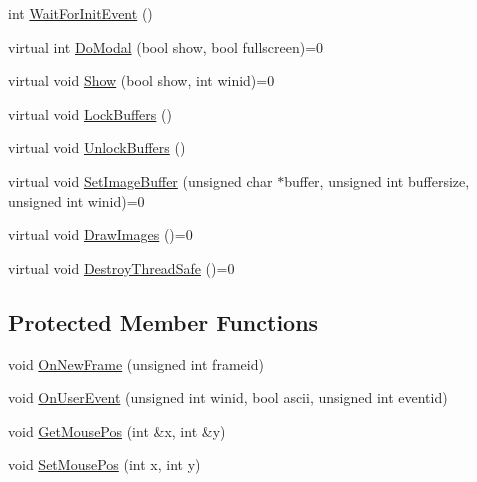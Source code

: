 \begin{DoxyCompactItemize}
int \hyperlink{classsvl_window_manager_base_a2e6ea04ac4c4403c6f442ed80b308267}{Wait\+For\+Init\+Event} ()
\item 
virtual int \hyperlink{classsvl_window_manager_base_a74b90c01c71feb43abc912d0f85b24f3}{Do\+Modal} (bool show, bool fullscreen)=0
\item 
virtual void \hyperlink{classsvl_window_manager_base_adb4ef704308882625b8a9bd5b978f408}{Show} (bool show, int winid)=0
\item 
virtual void \hyperlink{classsvl_window_manager_base_afcb9c9ab6b483e25e6e4a6be44cee53a}{Lock\+Buffers} ()
\item 
virtual void \hyperlink{classsvl_window_manager_base_a3de36fded4442ddf69cf2c9e8b2a5cfe}{Unlock\+Buffers} ()
\item 
virtual void \hyperlink{classsvl_window_manager_base_a7c9f61a0101acb234df5f8f192bd62af}{Set\+Image\+Buffer} (unsigned char $\ast$buffer, unsigned int buffersize, unsigned int winid)=0
\item 
virtual void \hyperlink{classsvl_window_manager_base_a5c285307a85fe67e084487041c82182b}{Draw\+Images} ()=0
\item 
virtual void \hyperlink{classsvl_window_manager_base_ae21e9e1b5af8e735e711422f478d335f}{Destroy\+Thread\+Safe} ()=0
\end{DoxyCompactItemize}
\subsection*{Protected Member Functions}
\begin{DoxyCompactItemize}
\item 
void \hyperlink{classsvl_window_manager_base_a1b9065121a86c241cf9623822e9dc4bd}{On\+New\+Frame} (unsigned int frameid)
\item 
void \hyperlink{classsvl_window_manager_base_a097a2e68082683d3fb50eeb7e768b2f9}{On\+User\+Event} (unsigned int winid, bool ascii, unsigned int eventid)
\item 
void \hyperlink{classsvl_window_manager_base_a08423e6af5c56905c370f9d2949a6857}{Get\+Mouse\+Pos} (int \&x, int \&y)
\item 
void \hyperlink{classsvl_window_manager_base_a73744dbd826d9b5edcb647bfd092d9a9}{Set\+Mouse\+Pos} (int x, int y)
\end{DoxyCompactItemize}
